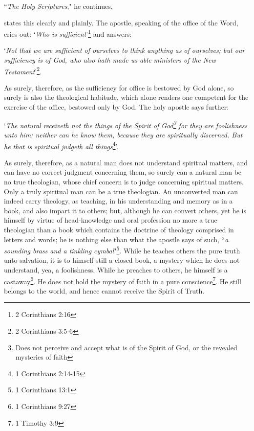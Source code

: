 ``\textit{The Holy Scriptures}," he continues,\\\begin{fancyquotes}states this clearly and plainly. The apostle, speaking of the office of the Word, cries out: `\textit{Who is sufficient}'\footnote{2 Corinthians 2:16} and answers: \begin{displayquote}`\textit{Not that we are sufficient of ourselves to think anything as of ourselves; but our sufficiency is of God, who also hath made us able ministers of the New Testament}'\footnote{2 Corinthians 3:5-6}.\end{displayquote} As surely, therefore, as the sufficiency for office is bestowed by God alone, so surely is also the theological habitude, which alone renders one competent for the exercise of the office, bestowed only by God. The holy apostle says further: \begin{displayquote}`\textit{The natural receiveth not the things of the Spirit of God\footnote{Does not perceive and accept what is of the Spirit of God, or the revealed mysteries of faith} for they are foolishness unto him: neither can he know them, because they are spiritually discerned. But he that is spiritual judgeth all things}\footnote{1 Corinthians 2:14-15}'.\end{displayquote}

As surely, therefore, as a natural man does not understand spiritual matters, and can have no correct judgment concerning them, so surely can a natural man be no true theologian, whose chief concern is to judge concerning spiritual matters. Only a truly spiritual man can be a true theologian. An unconverted man can indeed carry theology, as teaching, in his understanding and memory as in a book, and also impart it to others; but, although he can convert others, yet he is himself by virtue of head-knowledge and oral profession no more a true theologian than a book which contains the doctrine of theology comprised in letters and words; he is nothing else than what the apostle says of such, ``\textit{a sounding brass and a tinkling cymbal}"\footnote{1 Corinthians 13:1}. While he teaches others the pure truth unto salvation, it is to himself still a closed book, a mystery which he does not understand, yea, a foolishness. While he preaches to others, he himself is a castaway\footnote{1 Corinthians 9:27}. He does not hold the mystery of faith in a pure conscience\footnote{1 Timothy 3:9}. He still belongs to the world, and hence cannot receive the Spirit of Truth.\end{fancyquotes}
\par

